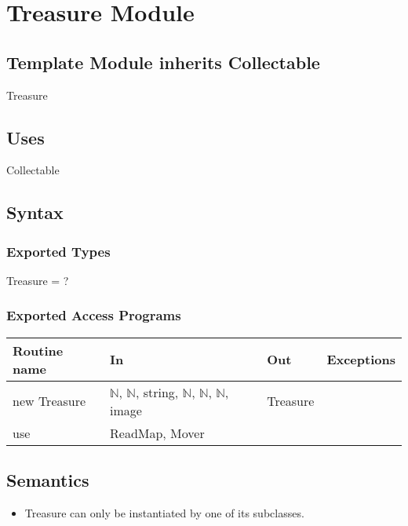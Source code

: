 \documentclass[12pt]{article}
\begin{document}
\newpage

\section*{Treasure Module}

\subsection*{Template Module inherits Collectable}

Treasure

\subsection*{Uses}

Collectable

\subsection*{Syntax}

\subsubsection*{Exported Types}

Treasure = ?

\subsubsection*{Exported Access Programs}

\begin{tabular}{| l | l | l | l |}
\hline
\textbf{Routine name} & \textbf{In} & \textbf{Out} & \textbf{Exceptions}\\
\hline
new Treasure & $\mathbb{N}$, $\mathbb{N}$, string, $\mathbb{N}$, $\mathbb{N}$, $\mathbb{N}$, image & Treasure & ~\\
\hline
use & ReadMap, Mover & ~ & ~\\
\hline
\end{tabular}

\subsection*{Semantics}

\begin{itemize}
    \item Treasure can only be instantiated by one of its subclasses.
\end{itemize}
\end{document}
